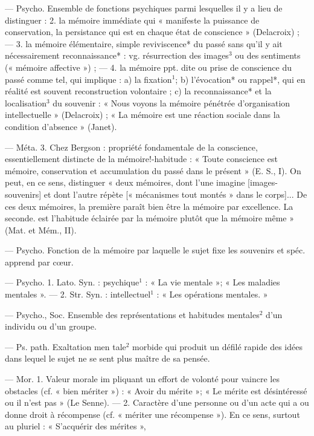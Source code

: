 \begin{itemize}[leftmargin=1cm, label=, itemsep=1pt]
— Psycho. Ensemble de fonctions psychiques parmi lesquelles il
y a lieu de distinguer : 2. la mémoire immédiate qui « manifeste la puissance
de conservation, la persistance qui
est en chaque état de conscience »
(Delacroix) ; — 3. la mémoire élémentaire, simple reviviscence* du passé
sans qu'il y ait nécessairement
reconnaissance* : vg. résurrection
des images$^3$ ou des sentiments (« mémoire affective ») ; — 4. la mémoire
ppt. dite ou prise de conscience du
passé comme tel, qui implique :
a) la fixation$^1$; b) l’évocation* ou
rappel*, qui en réalité est souvent
reconstruction volontaire ; c) la reconnaissance* et la localisation$^3$ du
souvenir : « Nous voyons la mémoire
pénétrée d'organisation  intellectuelle » (Delacroix) ; « La mémoire
est une réaction sociale dans la
condition d'absence » (Janet).

— Méta. 3. Chez Bergson : propriété fondamentale de la conscience,
essentiellement distincte de la mémoire!-habitude : « Toute conscience
est mémoire, conservation et accumulation du passé dans le présent »
(E. S., I). On peut, en ce sens, distinguer
« deux mémoires, dont l’une imagine [images-souvenirs] et dont
l’autre répète [« mécanismes tout
montés » dans le corps]... De ces
deux mémoires, la première paraît
bien être la mémoire par excellence.
La seconde. est l'habitude éclairée
par la mémoire plutôt que la mémoire
même » (Mat. et Mém., II).

 — Psycho.
Fonction de la mémoire par laquelle
le sujet fixe les souvenirs et spéc.
apprend par cœur.

 — Psycho. 1. Lato. Syn. :
psychique$^1$ : « La vie mentale »; « Les
maladies mentales ». — 2. Str. Syn. :
intellectuel$^1$ : « Les opérations mentales. »

 — Psycho., Soc. Ensemble
des représentations et habitudes mentales$^2$ d’un individu ou d’un groupe.

 — Ps. path. Exaltation men
tale$^2$ morbide qui produit un défilé
rapide des idées dans lequel le sujet
ne se sent plus maître de sa pensée.

 — Mor. 1. Valeur morale im
pliquant un effort de volonté pour
vaincre les obstacles (cf. « bien
mériter ») : « Avoir du mérite »; « Le
mérite est désintéressé ou il n'est
pas » (Le Senne). — 2. Caractère
d’une personne ou d’un acte qui a
ou donne droit à récompense (cf.
« mériter une récompense »). En ce
sens, surtout au pluriel : « S’acquérir
des mérites »,


\end{itemize}
